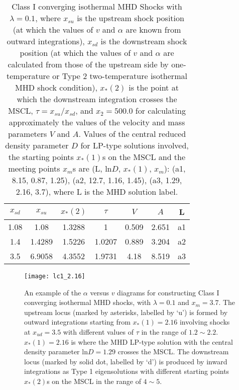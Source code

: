 \documentclass[fleqn,usenatbib]{mnras}
\begin{document}
\begin{table}
  \centering
  \caption{Class I converging isothermal MHD Shocks with $\lambda=0.1$, where $x_{su}$ is the upstream shock position (at which the values of $v$ and $\alpha$ are known from outward integrations), $x_{sd}$ is the downstream shock position (at which the values of $v$ and $\alpha$ are calculated from those of the upstream side by one-temperature or Type 2 two-temperature isothermal MHD shock condition), $x_{*}(2)$ is the point at which the downstream integration crosses the MSCL, $\tau=x_{su}/x_{sd}$, and $x_{2}=500.0$ for calculating approximately the values of the velocity and mass parameters $V$ and $A$. Values of the central reduced density parameter $D$ for LP-type solutions involved, the starting points $x_{*}(1)$s on the MSCL and the meeting points $x_{m}$s are (L, $\mathrm{ln}D$, $x_{*}(1)$, $x_{m}$): (a1, 8.15, 0.87, 1.25), (a2, 12.7, 1.16, 1.45), (a3, 1.29, 2.16, 3.7), where L is the MHD solution label.}
    \begin{tabular}{ccccccc}
    \hline
    $x_{sd}$ & $x_{su}$ & $x_{*}(2)$ & $\tau$ & $V$ & $A$ & L\\
    \hline
    1.08 & 1.08 & 1.3288 & 1 & 0.509 & 2.651 & a1 \\
    1.4 & 1.4289 & 1.5226 & 1.0207 & 0.889 & 3.204 & a2\\
    3.5 & 6.9058 & 4.3552 & 1.9731 & 4.18 & 8.519 & a3\\
    \hline
    \end{tabular}
    \label{t2}
\end{table}    

\begin{figure}
\centering
\texttt{[image: lc1\_2.16]}
\caption{An example of the $\alpha$ versus $v$ diagrams for constructing Class I converging isothermal MHD shocks, with $\lambda=0.1$ and $x_{m}=3.7$. The upstream locus (marked by asterisks, labelled by `u') is formed by outward integrations starting from $x_{*}(1)=2.16$ involving shocks at $x_{ud}=3.5$ with different values of $\tau$ in the range of $1.2\sim 2.2$. $x_{*}(1)=2.16$ is where the MHD LP-type solution with the central density parameter $\mathrm{ln}D=1.29$ crosses the MSCL. The downstream locus (marked by solid dot, labelled by `d') is produced by inward integrations as Type 1 eigensolutions with different starting points $x_{*}(2)$s on the MSCL in the range of $4\sim 5$.}
\label{3}
\end{figure}
\end{document}

